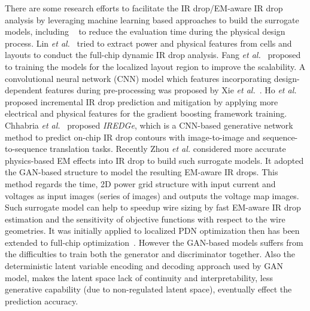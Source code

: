 There are some research efforts to facilitate the IR drop/EM-aware IR drop analysis by leveraging machine learning based approaches to build the surrogate models, including ~\cite{LinFang:2018vts,Fang:2018dynireco,HoKahng:ICCAD'19,Xie:2020powernet,Sachin:ASPDAC'21} to reduce the evaluation time during the physical design process.  Lin {\it et al.}~\cite{LinFang:2018vts} tried to extract power and physical features from cells and layouts to conduct the full-chip dynamic IR drop analysis. Fang {\it et al.}~\cite{Fang:2018dynireco} proposed to training the models for the localized layout region to improve the scalability.  A convolutional neural network (CNN) model which features incorporating design-dependent features during pre-processing was proposed by Xie {\it et al.}~\cite{Xie:2020powernet}. Ho {\it et al.}~\cite{HoKahng:ICCAD'19} proposed incremental IR drop prediction and mitigation by applying more electrical and physical features for the gradient boosting framework training. Chhabria {\it et al.}~\cite{Sachin:ASPDAC'21} proposed {\it IREDGe}, which is a CNN-based generative network method to predict on-chip IR drop contours with image-to-image and sequence-to-sequence translation tasks.
Recently Zhou {\it et al.} \cite{ZhouJin:ICCAD'20} considered more accurate physics-based EM effects into IR drop to build such surrogate models. It adopted the GAN-based structure to model the resulting EM-aware IR drops.  This method regards the time, 2D power grid structure with input current and voltages as input images (series of images) and outputs the voltage map images. Such surrogate model can help to speedup wire sizing by fast EM-aware IR drop estimation and the sensitivity of objective functions with respect to the wire geometries. It was initially applied to localized PDN optimization then has been extended to full-chip optimization~\cite{HanLiu:TCAD'22-23}.
However the GAN-based models suffers from the difficulties to train both the generator and discriminator together. Also the deterministic latent variable encoding and decoding approach used by GAN model, makes the latent space lack of continuity and interpretability, less generative capability (due to non-regulated latent space), eventually effect the prediction accuracy.


